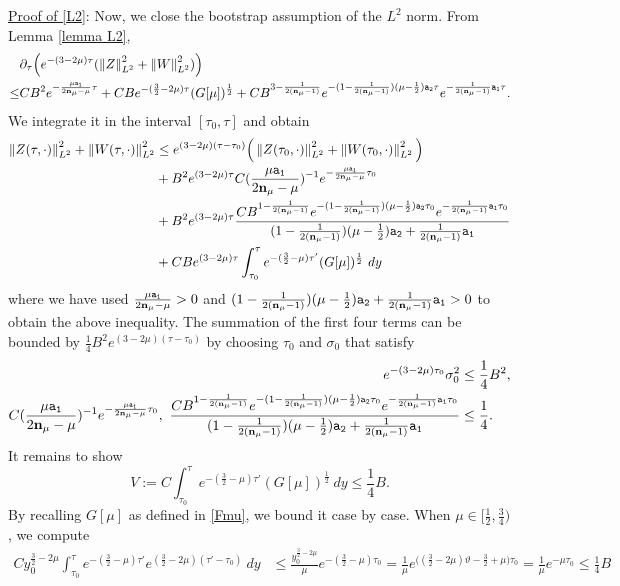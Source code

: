 \documentclass{article}
\newcommand{\norm}[1]{\left\lVert#1\right\rVert}
\newcommand{\pa}{\partial}
\def\be{\begin{equation}}
\def\ee{\end{equation}}
\def\beqa{\begin{equation}\begin{aligned}}
\def\eeqa{\end{aligned}\end{equation}}
\def\espz{Z}
\def\espw{W}
\def\epone{\mathtt{a_1}}
\def\eptwo{\mathtt{a_2}}
\def\ndmu{{\bf{n}_{\mu}}}
\numberwithin{equation}{section}
\begin{document}
\noindent\underline{Proof of \eqref{L2}}: Now, we close the bootstrap assumption of the $L^2$ norm. From Lemma \ref{lemma L2},
 \begin{align*}
    & \pa_\tau\Big(e^{-(3-2\mu)\tau}(\norm{\espz}_{L^2}^2+\norm{\espw}_{L^2}^2)\Big) \\ \leq&  CB^2 e^{-\frac{\mu\epone}{2\ndmu-\mu}\tau} +CBe^{-(\frac{3}{2}-2\mu)\tau}(G[\mu])^{\frac12} +CB^{3-\frac{1}{2(\ndmu-1)}} e^{-(1-\frac{1}{2(\ndmu-1)})(\mu-\frac12)\eptwo \tau}e^{-\frac{1}{2(\ndmu-1)}\epone\tau} .
 \end{align*}
 We integrate it in the interval $[\tau_0,\tau]$ and obtain
 \begin{align*}
    \norm{\espz(\tau,\cdot)}_{L^2}^2+\norm{\espw(\tau,\cdot)}_{L^2}^2 &\leq e^{(3-2\mu)(\tau-\tau_0)}\Big(\norm{\espz(\tau_0,\cdot)}_{L^2}^2+\norm{\espw(\tau_0,\cdot)}_{L^2}^2\Big)\\
   &+ B^2e^{(3-2\mu)\tau}C(\frac{\mu\epone}{2\ndmu-\mu})^{-1}e^{-\frac{\mu\epone}{2\ndmu-\mu}\tau_0}\\
    &+B^2e^{(3-2\mu)\tau}\frac{CB^{1-\frac{1}{2(\ndmu-1)}}e^{-(1-\frac{1}{2(\ndmu-1)})(\mu-\frac12)\eptwo \tau_0}e^{-\frac{1}{2(\ndmu-1)}\epone\tau_0}}{(1-\frac{1}{2(\ndmu-1)})(\mu-\frac12)\eptwo+\frac{1}{2(\ndmu-1)}\epone}   \\
    &+CBe^{(3-2\mu)\tau}\int_{\tau_0}^\tau e^{-(\frac32-\mu)\tau'}(G[\mu])^{\frac12}\ dy
 \end{align*}
 where we have used $\frac{\mu\epone}{2\ndmu-\mu}>0$ and $(1-\frac{1}{2(\ndmu-1)})(\mu-\frac12)\eptwo+\frac{1}{2(\ndmu-1)}\epone>0$ to obtain the above inequality.
 The summation of the first four terms can be bounded by $\frac{1}{4}B^2e^{(3-2\mu)(\tau-\tau_0)}$ by choosing $\tau_0$ and $\sigma_0$ that satisfy
 \beqa
       e^{-(3-2\mu)\tau_0}\sigma_0^2&\leq \frac14 B^2,\\
      C(\frac{\mu\epone}{2\ndmu-\mu})^{-1}e^{-\frac{\mu\epone}{2\ndmu-\mu}\tau_0}, \ \frac{CB^{1-\frac{1}{2(\ndmu-1)}}e^{-(1-\frac{1}{2(\ndmu-1)})(\mu-\frac12)\eptwo \tau_0}e^{-\frac{1}{2(\ndmu-1)}\epone\tau_0}}{(1-\frac{1}{2(\ndmu-1)})(\mu-\frac12)\eptwo+\frac{1}{2(\ndmu-1)}\epone}  &\leq \frac{1}{4}.
 \eeqa
 It remains to show 
 \be\label{V}
    V:=C\int_{\tau_0}^\tau e^{-(\frac32-\mu)\tau'}(G[\mu])^{\frac12}\ dy\leq \frac{1}{4}B.
 \ee
 By recalling $G[\mu]$ as defined in \eqref{Fmu}, we bound it case by case. When $\mu\in[\frac12,\frac34)$, we compute
 \begin{align*}
   Cy_0^{\frac32-2\mu}\int_{\tau_0}^\tau e^{-(\frac32-\mu)\tau'} e^{(\frac32-2\mu)(\tau'-\tau_0)}\ dy &\leq \frac{y_0^{\frac32-2\mu}}{\mu}e^{-(\frac{3}{2}-\mu)\tau_0} = \frac1\mu e^{\Big((\frac{3}{2}-2\mu)\vartheta -\frac32+\mu\Big)\tau_0} = \frac{1}{\mu} e^{-\mu\tau_0} \leq \frac{1}{4}B
 \end{align*}
\end{document}
